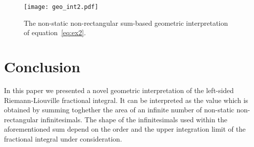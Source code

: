 \documentclass[twoside,reqno,11pt]{fcaa-var} %
\begin{document}
\begin{figure}[htb]
\centering
\texttt{[image: geo\_int2.pdf]}
\caption{The non-static non-rectangular sum-based geometric interpretation of equation~\eqref{eq:ex2}.}
\label{fig:geo2}
\end{figure}

\section{Conclusion}
\noindent
In this paper we presented a novel geometric interpretation of the left-sided 
Riemann-Liouville fractional integral. It can be interpreted as the value which is 
obtained by summing toghether the area of an infinite number of non-static non-rectangular infinitesimals. The shape of the infinitesimals used within the aforementioned sum depend on the order and the upper integration limit of the fractional integral under consideration.





\end{document}
